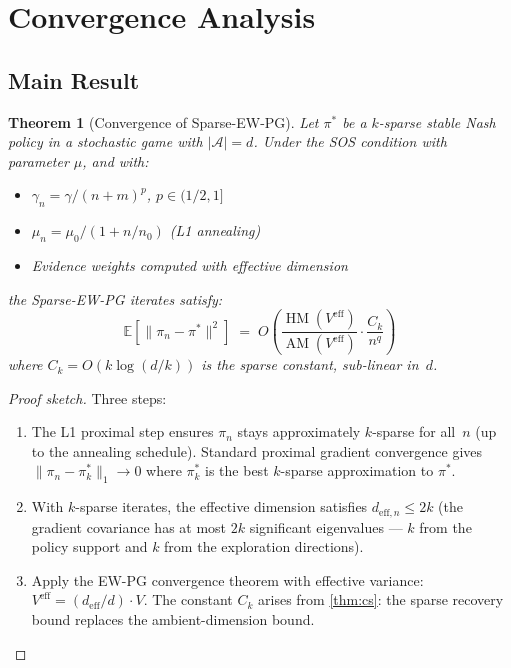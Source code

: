 \documentclass[11pt,a4paper]{article}
\newtheorem{theorem}{Theorem}[section]
\DeclareMathOperator{\AM}{AM}
\DeclareMathOperator{\HM}{HM}
\newcommand{\E}{\mathbb{E}}
\newcommand{\norm}[1]{\|#1\|}
\begin{document}
\section{Convergence Analysis}

\subsection{Main Result}

\begin{theorem}[Convergence of Sparse-EW-PG]\label{thm:main}
Let $\pi^*$ be a $k$-sparse stable Nash policy in a stochastic game
with $|\mathcal{A}| = d$. Under the SOS condition with parameter $\mu$,
and with:
\begin{itemize}
  \item $\gamma_n = \gamma/(n+m)^p$, $p \in (1/2, 1]$
  \item $\mu_n = \mu_0 / (1 + n/n_0)$ (L1 annealing)
  \item Evidence weights computed with effective dimension
\end{itemize}
the Sparse-EW-PG iterates satisfy:
\begin{equation}\label{eq:main-result}
  \E[\norm{\pi_n - \pi^*}^2] \;=\; O\!\left(
    \frac{\HM(V^{\text{eff}})}{\AM(V^{\text{eff}})} \cdot
    \frac{C_k}{n^q}
  \right)
\end{equation}
where $C_k = O(k \log(d/k))$ is the \emph{sparse constant},
sub-linear in~$d$.
\end{theorem}

\begin{proof}[Proof sketch]
Three steps:
\begin{enumerate}
  \item The L1 proximal step ensures $\pi_n$ stays approximately
    $k$-sparse for all~$n$ (up to the annealing schedule). Standard
    proximal gradient convergence gives $\norm{\pi_n - \pi^*_k}_1 \to 0$
    where $\pi^*_k$ is the best $k$-sparse approximation to $\pi^*$.

  \item With $k$-sparse iterates, the effective dimension satisfies
    $d_{\text{eff},n} \leq 2k$ (the gradient covariance has at most
    $2k$ significant eigenvalues --- $k$ from the policy support
    and $k$ from the exploration directions).

  \item Apply the EW-PG convergence theorem with effective variance:
    $V^{\text{eff}} = (d_{\text{eff}}/d) \cdot V$.
    The constant $C_k$ arises from \cref{thm:cs}: the sparse recovery
    bound replaces the ambient-dimension bound.
\end{enumerate}
\end{proof}
\end{document}
